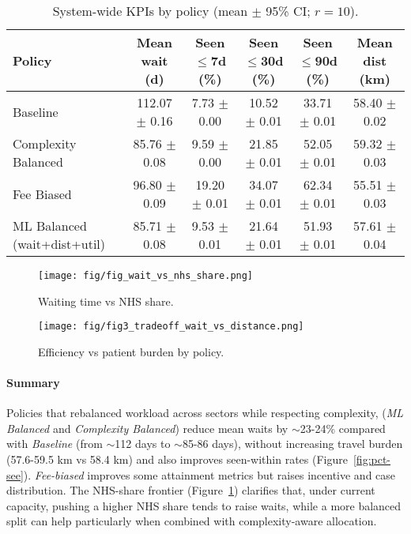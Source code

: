 \documentclass[ %
                    author={Nattanan Nawakitbamrung},
                supervisor={Dr. Sébastien Rochat},
                    degree={MSc},
                     title={Developing and Evaluating the Impact of a Single Patient Treatment List (PTL) for an NHS Integrated Care System},
                  subtitle={},
                      type={},
                      year={2025}]{dissertation}
\begin{document}
\begin{table}[htbp]
\centering
\footnotesize
\setlength{\tabcolsep}{4pt}
\begin{adjustbox}{width=\linewidth}
\begin{tabular}{lccccc}
\toprule
\textbf{Policy} & \textbf{Mean wait (d)} & \textbf{Seen$\le$7d (\%)} &
\textbf{Seen$\le$30d (\%)} & \textbf{Seen$\le$90d (\%)} & \textbf{Mean dist (km)} \\
\midrule
Baseline & 112.07 $\pm$ 0.16 & 7.73 $\pm$ 0.00 & 10.52 $\pm$ 0.01 & 33.71 $\pm$ 0.01 & 58.40 $\pm$ 0.02 \\
Complexity Balanced & 85.76 $\pm$ 0.08 & 9.59 $\pm$ 0.00 & 21.85 $\pm$ 0.01 & 52.05 $\pm$ 0.01 & 59.32 $\pm$ 0.03 \\
Fee Biased & 96.80 $\pm$ 0.09 & 19.20 $\pm$ 0.01 & 34.07 $\pm$ 0.01 & 62.34 $\pm$ 0.01 & 55.51 $\pm$ 0.03 \\
ML Balanced (wait+dist+util) & 85.71 $\pm$ 0.08 & 9.53 $\pm$ 0.01 & 21.64 $\pm$ 0.01 & 51.93 $\pm$ 0.01 & 57.61 $\pm$ 0.04 \\
\bottomrule
\end{tabular}
\end{adjustbox}
\caption{System-wide KPIs by policy (mean $\pm$ 95\% CI; $r=10$).}
\label{tab:sys-kpi-ci}
\end{table}

\begin{figure}[htbp]
\centering
\texttt{[image: fig/fig\_wait\_vs\_nhs\_share.png]}
\caption{Waiting time vs NHS share.}
\label{fig:wait-time-share}
\end{figure}

\clearpage
\begin{figure}[htbp]
\centering
\texttt{[image: fig/fig3\_tradeoff\_wait\_vs\_distance.png]}
    \caption{Efficiency vs patient burden by policy.}
    \label{fig:tradeoff-wait}
\end{figure}

\paragraph{Summary}
Policies that rebalanced workload across sectors while respecting complexity, (\textit{ML Balanced} and \textit{Complexity Balanced}) reduce mean waits by $\sim$23-24\% compared with \textit{Baseline} (from $\sim$112 days to $\sim$85-86 days), without increasing travel burden (57.6-59.5 km vs 58.4 km) and also improves seen-within rates (Figure~\ref{fig:pct-see}). \textit{Fee-biased} improves some attainment metrics but raises incentive and case distribution. The NHS-share frontier (Figure~\ref{fig:wait-time-share}) clarifies that, under current capacity, pushing a higher NHS share tends to raise waits, while a more balanced split can help particularly when combined with complexity-aware allocation.
\end{document}
